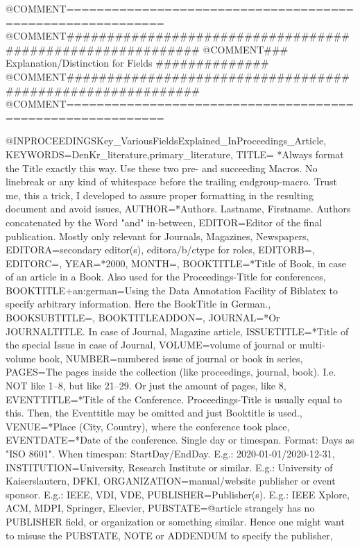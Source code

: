 @COMMENT{===========================================================}
@COMMENT{###########################################################}
@COMMENT{###    Explanation/Distinction for Fields    ##############}
@COMMENT{###########################################################}
@COMMENT{===========================================================}


@INPROCEEDINGS{Key_VariousFieldsExplained_InProceedings_Article,
    KEYWORDS={DenKr_literature,primary_literature},
    TITLE={\begingroup
        *Always format the Title exactly this way. Use these two pre- and succeeding Macros. No linebreak or any kind of whitespace before the trailing endgroup-macro. Trust me, this a trick, I developed to assure proper formatting in the resulting document and avoid issues\endgroup},
    AUTHOR={*Authors. Lastname, Firstname. Authors concatenated by the Word "and" in-between},
    EDITOR={Editor of the final publication. Mostly only relevant for Journals, Magazines, Newspapers},
    EDITORA={secondary editor(s), editora/b/ctype for roles},
    EDITORB={},
    EDITORC={},
    YEAR={*2000},
    MONTH={},
    BOOKTITLE={*Title of Book, in case of an article in a Book. Also used for the Proceedings-Title for conferences},
    BOOKTITLE+an:german={Using the Data Annotation Facility of Biblatex to specify arbitrary information. Here the BookTitle in German.},
    BOOKSUBTITLE={},
    BOOKTITLEADDON={},
    JOURNAL={*Or JOURNALTITLE. In case of Journal, Magazine article},
    ISSUETITLE={*Title of the special Issue in case of Journal},
    VOLUME={volume of journal or multi-volume book},
    NUMBER={numbered issue of journal or book in series},
    PAGES={The pages inside the collection (like proceedings, journal, book). I.e. NOT like 1--8, but like 21--29. Or just the amount of pages, like 8},
    EVENTTITLE={*Title of the Conference. Proceedings-Title is usually equal to this. Then, the Eventtitle may be omitted and just Booktitle is used.},
    VENUE={*Place (City, Country), where the conference took place},
    EVENTDATE={*Date of the conference. Single day or timespan. Format: Days as "ISO 8601". When timespan: StartDay/EndDay. E.g.: 2020-01-01/2020-12-31},
    INSTITUTION={University, Research Institute or similar. E.g.: University of Kaiserslautern, DFKI},
    ORGANIZATION={manual/website publisher or event sponsor. E.g.: IEEE, VDI, VDE},
    PUBLISHER={Publisher(s). E.g.: IEEE Xplore, ACM, MDPI, Springer, Elsevier},
    PUBSTATE={@article strangely has no PUBLISHER field, or organization or something similar. Hence one might want to misuse the PUBSTATE, NOTE or ADDENDUM to specify the publisher},
}

